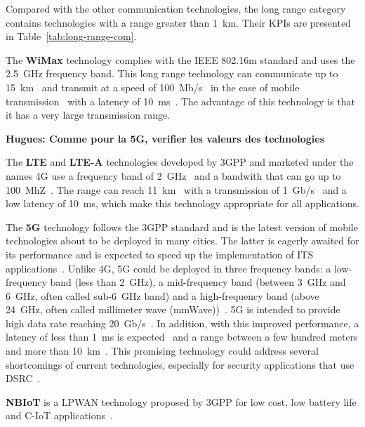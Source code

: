 Compared with the other communication technologies, the long range category contains technologies with a range greater than 1~km. Their \acrshort{KPI}s are presented in Table~\ref{tab:long-range-com}.

The \textbf{\acrfull{WiMax}} technology complies with the IEEE 802.16m standard and uses the 2.5~GHz frequency band. This long range technology can communicate up to 15~km~\cite{selvarani_comparative_2014} and transmit at a speed of 100~Mb/s~\cite{anwer_survey_2014} in the case of mobile transmission~\cite{selvarani_comparative_2014} with a latency of 10~ms~\cite{msadaa_comparative_2010}. The advantage of this technology is that it has a very large transmission range.

{\bf Hugues: Comme pour la 5G, verifier les valeurs des technologies}

The \textbf{\acrfull{LTE}} and \textbf{\acrfull{LTE-A}} technologies developed by 3GPP and marketed under the names 4G use a frequency band of 2~GHz~\cite{seo_lte_2016} and a bandwith that can go up to 100~MhZ~\cite{araniti_lte_2013}. %
The range can reach 11~km~\cite{shah_5g_2018} with a transmission of 1~Gb/s~\cite{araniti_lte_2013} and a low latency of 10~ms, which make this technology appropriate for all applications. 

The \textbf{5G} technology follows the 3GPP standard and is the latest version of mobile technologies about to be deployed in many cities. The latter is eagerly awaited for its performance and is expected to speed up the implementation of ITS applications~\cite{foubert_long-range_2020}. Unlike 4G, 5G could be deployed in three frequency bands: a low-frequency band (less than 2~GHz), a mid-frequency band (between 3~GHz and 6~GHz, often called sub-6~GHz band) and a high-frequency band (above 24~GHz, often called millimeter wave (mmWave))~\cite{foubert_long-range_2020}. 5G is intended to provide high data rate reaching 20~Gb/s~\cite{hussain_integration_2019}.
In addition, with this improved performance, a latency of less than 1~ms is expected~\cite{hussain_integration_2019} and a range between a few hundred meters and more than 10~km~\cite{foubert_long-range_2020}. This promising technology could address several shortcomings of current technologies, especially for security applications that use \acrshort{DSRC}~\cite{shah_5g_2018}. 

\textbf{\acrfull{NBIoT}} is a \acrfull{LPWAN} technology proposed by 3GPP for low cost, low battery life and \acrfull{C-IoT} applications~\cite{qadir_low_2018,routray_narrowband_2021}.

